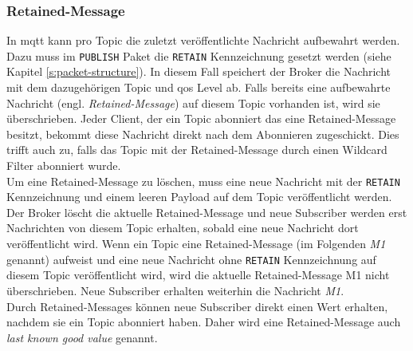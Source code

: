 \subsubsection{Retained-Message} \label{s:retained-messages}
In \ac{mqtt} kann pro Topic die zuletzt veröffentlichte Nachricht aufbewahrt werden.
Dazu muss im \verb|PUBLISH| Paket die \verb|RETAIN| Kennzeichnung gesetzt werden (siehe Kapitel \ref{s:packet-structure}).
In diesem Fall speichert der Broker die Nachricht mit dem dazugehörigen Topic und \ac{qos} Level ab.
Falls bereits eine aufbewahrte Nachricht (engl. \textit{Retained-Message}) auf diesem Topic vorhanden ist, wird sie überschrieben.
Jeder Client, der ein Topic abonniert das eine Retained-Message besitzt, bekommt diese Nachricht direkt nach dem Abonnieren zugeschickt.
Dies trifft auch zu, falls das Topic mit der Retained-Message durch einen Wildcard Filter abonniert wurde.
\cite{teamRetainedMessagesMQTT}
\\
Um eine Retained-Message zu löschen, muss eine neue Nachricht mit der \verb|RETAIN| Kennzeichnung und einem leeren Payload auf dem Topic veröffentlicht werden. Der Broker löscht die aktuelle Retained-Message und neue Subscriber werden erst Nachrichten von diesem Topic erhalten, sobald eine neue Nachricht dort veröffentlicht wird.
Wenn ein Topic eine Retained-Message (im Folgenden \textit{M1} genannt) aufweist und eine neue Nachricht ohne \verb|RETAIN| Kennzeichnung auf diesem Topic veröffentlicht wird, wird die aktuelle Retained-Message M1 nicht überschrieben. Neue Subscriber erhalten weiterhin die Nachricht \textit{M1}.
\cite{mqtt5Specification}
\\
Durch Retained-Messages können neue Subscriber direkt einen Wert erhalten, nachdem sie ein Topic abonniert haben. Daher wird eine Retained-Message auch \textit{last known good value} genannt.
\cite{teamRetainedMessagesMQTT}

